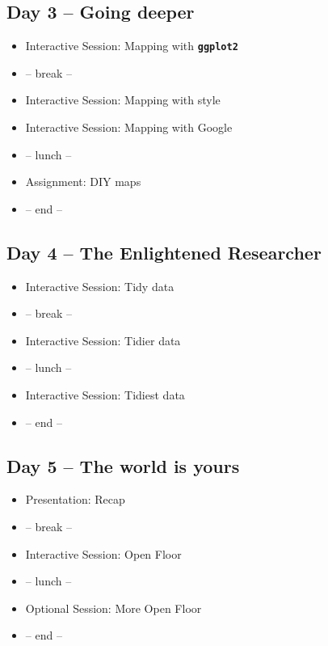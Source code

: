 \documentclass[]{book}
\providecommand{\tightlist}{%
  \setlength{\itemsep}{0pt}\setlength{\parskip}{0pt}}
\theoremstyle{definition}
\theoremstyle{definition}
\theoremstyle{definition}
\theoremstyle{remark}
\begin{document}
\subsection*{Day 3 -- Going deeper}\label{day-3-going-deeper}

\begin{itemize}
\tightlist
\item
  Interactive Session: Mapping with \textbf{\texttt{ggplot2}}
\item
  -- break --
\item
  Interactive Session: Mapping with style
\item
  Interactive Session: Mapping with Google
\item
  -- lunch --
\item
  Assignment: DIY maps
\item
  -- end --
\end{itemize}

\subsection*{Day 4 -- The Enlightened
Researcher}\label{day-4-the-enlightened-researcher}

\begin{itemize}
\tightlist
\item
  Interactive Session: Tidy data
\item
  -- break --
\item
  Interactive Session: Tidier data
\item
  -- lunch --
\item
  Interactive Session: Tidiest data
\item
  -- end --
\end{itemize}

\subsection*{Day 5 -- The world is
yours}\label{day-5-the-world-is-yours}

\begin{itemize}
\tightlist
\item
  Presentation: Recap
\item
  -- break --
\item
  Interactive Session: Open Floor
\item
  -- lunch --
\item
  Optional Session: More Open Floor
\item
  -- end --
\end{itemize}
\end{document}
